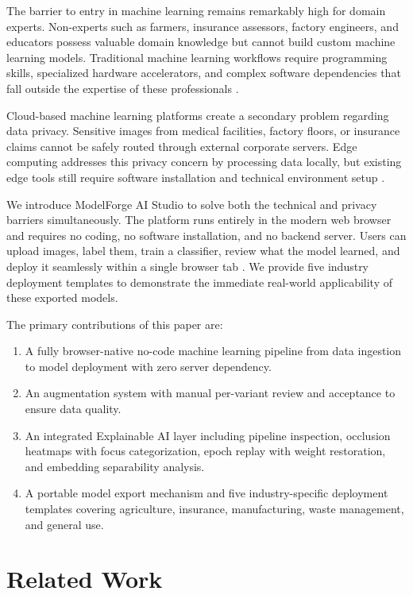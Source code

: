 \documentclass[conference]{IEEEtran}
\begin{document}
The barrier to entry in machine learning remains remarkably high for domain experts. Non-experts such as farmers, insurance assessors, factory engineers, and educators possess valuable domain knowledge but cannot build custom machine learning models. Traditional machine learning workflows require programming skills, specialized hardware accelerators, and complex software dependencies that fall outside the expertise of these professionals \cite{Carney2020}. 

Cloud-based machine learning platforms create a secondary problem regarding data privacy. Sensitive images from medical facilities, factory floors, or insurance claims cannot be safely routed through external corporate servers. Edge computing addresses this privacy concern by processing data locally, but existing edge tools still require software installation and technical environment setup \cite{Lian2021}.

We introduce ModelForge AI Studio to solve both the technical and privacy barriers simultaneously. The platform runs entirely in the modern web browser and requires no coding, no software installation, and no backend server. Users can upload images, label them, train a classifier, review what the model learned, and deploy it seamlessly within a single browser tab \cite{Smilkov2019}. We provide five industry deployment templates to demonstrate the immediate real-world applicability of these exported models.

The primary contributions of this paper are:
\begin{enumerate}
    \item A fully browser-native no-code machine learning pipeline from data ingestion to model deployment with zero server dependency.
    \item An augmentation system with manual per-variant review and acceptance to ensure data quality.
    \item An integrated Explainable AI layer including pipeline inspection, occlusion heatmaps with focus categorization, epoch replay with weight restoration, and embedding separability analysis.
    \item A portable model export mechanism and five industry-specific deployment templates covering agriculture, insurance, manufacturing, waste management, and general use.
\end{enumerate}

\section{Related Work}
\end{document}
